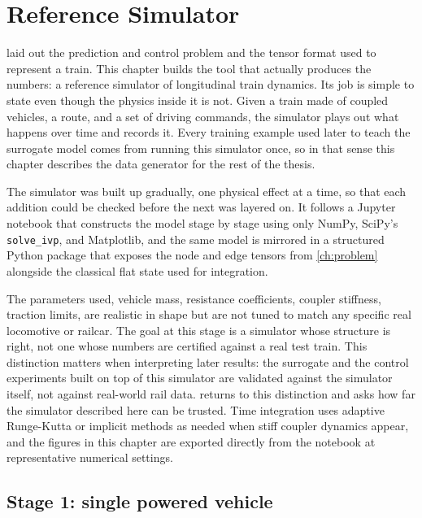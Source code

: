 \chapter{Reference Simulator}
\label{ch:refsim}

 laid out the prediction and control problem and the tensor format used to represent a train.
This chapter builds the tool that actually produces the numbers: a reference simulator of longitudinal train dynamics.
Its job is simple to state even though the physics inside it is not.
Given a train made of coupled vehicles, a route, and a set of driving commands, the simulator plays out what happens over time and records it.
Every training example used later to teach the surrogate model comes from running this simulator once, so in that sense this chapter describes the data generator for the rest of the thesis.

The simulator was built up gradually, one physical effect at a time, so that each addition could be checked before the next was layered on.
It follows a Jupyter notebook that constructs the model stage by stage using only NumPy, SciPy's \texttt{solve\_ivp}, and Matplotlib, and the same model is mirrored in a structured Python package that exposes the node and edge tensors from \cref{ch:problem} alongside the classical flat state used for integration.

The parameters used, vehicle mass, resistance coefficients, coupler stiffness, traction limits, are realistic in shape but are not tuned to match any specific real locomotive or railcar.
The goal at this stage is a simulator whose structure is right, not one whose numbers are certified against a real test train.
This distinction matters when interpreting later results: the surrogate and the control experiments built on top of this simulator are validated against the simulator itself, not against real-world rail data.  returns to this distinction and asks how far the simulator described here can be trusted.
Time integration uses adaptive Runge-Kutta or implicit methods as needed when stiff coupler dynamics appear, and the figures in this chapter are exported directly from the notebook at representative numerical settings.

\section{Stage 1: single powered vehicle}

